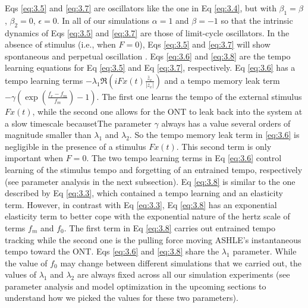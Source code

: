 \documentclass{report}
\begin{document}
Eqs \eqref{eq:3.5} and \eqref{eq:3.7} are oscillators like the one in Eq \eqref{eq:3.4}, but with $\beta_1 = \beta$, $\beta_2=0$, $\epsilon=0$. In all of our simulations $\alpha=1$ and $\beta=-1$ so that the intrinsic dynamics of Eqs \eqref{eq:3.5} and \eqref{eq:3.7} are those of limit-cycle oscillators. In the absence of stimulus (i.e., when $F = 0$), Eqs \eqref{eq:3.5} and \eqref{eq:3.7} will show spontaneous and perpetual oscillation \cite{kim2015signal}. Eqs \eqref{eq:3.6} and \eqref{eq:3.8} are the tempo learning equations for Eq \eqref{eq:3.5} and Eq \eqref{eq:3.7}, respectively. Eq \eqref{eq:3.6} has a tempo learning terms $-\lambda_1\Re\left( iFx(t)\frac{\bar{z}_e}{|z_e|} \right)$ and a tempo memory leak term $-\gamma\left( \exp\left(\frac{f_e-f_m}{f_m}\right)-1 \right)$. The first one learns the tempo of the external stimulus $Fx(t)$, while the second one allows for the ONT to leak back into the system at a slow timescale becausetThe parameter $\gamma$ always has a value several orders of magnitude smaller than $\lambda_1$ and $\lambda_2$. So the tempo memory leak term in \eqref{eq:3.6} is negligible in the presence of a stimulus $Fx(t)$. This second term is only important when $F = 0$. The two tempo learning terms in Eq \eqref{eq:3.6} control learning of the stimulus tempo and forgetting of an entrained tempo, respectively (see parameter analysis in the next subsection). Eq \eqref{eq:3.8} is similar to the one described by Eq \eqref{eq:3.3}, which contained a tempo learning and an elasticity term. However, in contrast with Eq \eqref{eq:3.3}, Eq \eqref{eq:3.8} has an exponential elasticity term to better cope with the exponential nature of the hertz scale of terms $f_m$ and $f_0$. The first term in Eq \eqref{eq:3.8} carries out entrained tempo tracking while the second one is the pulling force moving ASHLE's instantaneous tempo toward the ONT. Eqs \eqref{eq:3.6} and \eqref{eq:3.8} share the $\lambda_1$ parameter. While the value of $f_0$ may change between different simulations that we carried out, the values of $\lambda_1$ and $\lambda_2$ are always fixed across all our simulation experiments (see parameter analysis and model optimization in the upcoming sections to understand how we picked the values for these two parameters).
\end{document}
